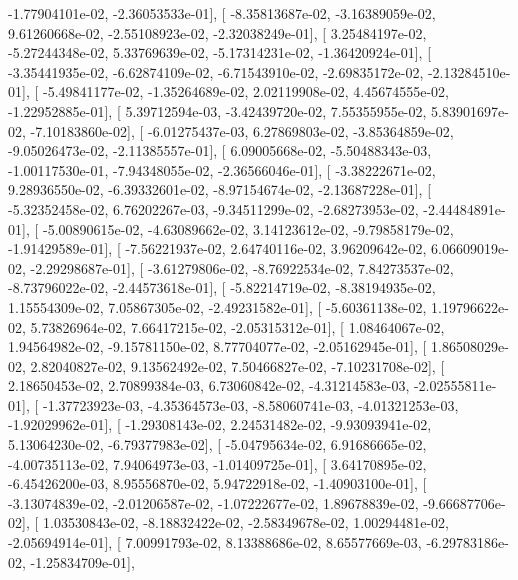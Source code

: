 \documentclass{article}
\begin{document}
         -1.77904101e-02,  -2.36053533e-01],
       [ -8.35813687e-02,  -3.16389059e-02,   9.61260668e-02,
         -2.55108923e-02,  -2.32038249e-01],
       [  3.25484197e-02,  -5.27244348e-02,   5.33769639e-02,
         -5.17314231e-02,  -1.36420924e-01],
       [ -3.35441935e-02,  -6.62874109e-02,  -6.71543910e-02,
         -2.69835172e-02,  -2.13284510e-01],
       [ -5.49841177e-02,  -1.35264689e-02,   2.02119908e-02,
          4.45674555e-02,  -1.22952885e-01],
       [  5.39712594e-03,  -3.42439720e-02,   7.55355955e-02,
          5.83901697e-02,  -7.10183860e-02],
       [ -6.01275437e-03,   6.27869803e-02,  -3.85364859e-02,
         -9.05026473e-02,  -2.11385557e-01],
       [  6.09005668e-02,  -5.50488343e-03,  -1.00117530e-01,
         -7.94348055e-02,  -2.36566046e-01],
       [ -3.38222671e-02,   9.28936550e-02,  -6.39332601e-02,
         -8.97154674e-02,  -2.13687228e-01],
       [ -5.32352458e-02,   6.76202267e-03,  -9.34511299e-02,
         -2.68273953e-02,  -2.44484891e-01],
       [ -5.00890615e-02,  -4.63089662e-02,   3.14123612e-02,
         -9.79858179e-02,  -1.91429589e-01],
       [ -7.56221937e-02,   2.64740116e-02,   3.96209642e-02,
          6.06609019e-02,  -2.29298687e-01],
       [ -3.61279806e-02,  -8.76922534e-02,   7.84273537e-02,
         -8.73796022e-02,  -2.44573618e-01],
       [ -5.82214719e-02,  -8.38194935e-02,   1.15554309e-02,
          7.05867305e-02,  -2.49231582e-01],
       [ -5.60361138e-02,   1.19796622e-02,   5.73826964e-02,
          7.66417215e-02,  -2.05315312e-01],
       [  1.08464067e-02,   1.94564982e-02,  -9.15781150e-02,
          8.77704077e-02,  -2.05162945e-01],
       [  1.86508029e-02,   2.82040827e-02,   9.13562492e-02,
          7.50466827e-02,  -7.10231708e-02],
       [  2.18650453e-02,   2.70899384e-03,   6.73060842e-02,
         -4.31214583e-03,  -2.02555811e-01],
       [ -1.37723923e-03,  -4.35364573e-03,  -8.58060741e-03,
         -4.01321253e-03,  -1.92029962e-01],
       [ -1.29308143e-02,   2.24531482e-02,  -9.93093941e-02,
          5.13064230e-02,  -6.79377983e-02],
       [ -5.04795634e-02,   6.91686665e-02,  -4.00735113e-02,
          7.94064973e-03,  -1.01409725e-01],
       [  3.64170895e-02,  -6.45426200e-03,   8.95556870e-02,
          5.94722918e-02,  -1.40903100e-01],
       [ -3.13074839e-02,  -2.01206587e-02,  -1.07222677e-02,
          1.89678839e-02,  -9.66687706e-02],
       [  1.03530843e-02,  -8.18832422e-02,  -2.58349678e-02,
          1.00294481e-02,  -2.05694914e-01],
       [  7.00991793e-02,   8.13388686e-02,   8.65577669e-03,
         -6.29783186e-02,  -1.25834709e-01],
\end{document}
